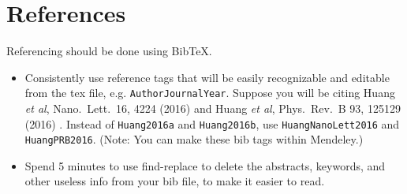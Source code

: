 \documentclass[aps,prb,twocolumn,superscriptaddress,floatfix,longbibliography]{revtex4-2}
\begin{document}
\section{\label{sec:References}References}

\noindent Referencing should be done using BibTeX.
\begin{itemize}[label=$\Box$]

\item Consistently use reference tags that will be easily recognizable and editable from the tex file, e.g. {\tt AuthorJournalYear}. Suppose you will be citing
Huang {\it et al}, Nano.\ Lett.\ 16, 4224 (2016) \cite{HuangNanoLett2016} and
Huang {\it et al}, Phys.\ Rev.\ B 93, 125129 (2016) \cite{HuangPRB2016}.
Instead of {\tt Huang2016a} and {\tt Huang2016b}, use {\tt HuangNanoLett2016} and {\tt HuangPRB2016}. (Note: You can make these bib tags within Mendeley.)

\item Spend 5 minutes to use find-replace to delete the abstracts, keywords, and other useless info from your bib file, to make it easier to read.


\end{itemize}
\end{document}
